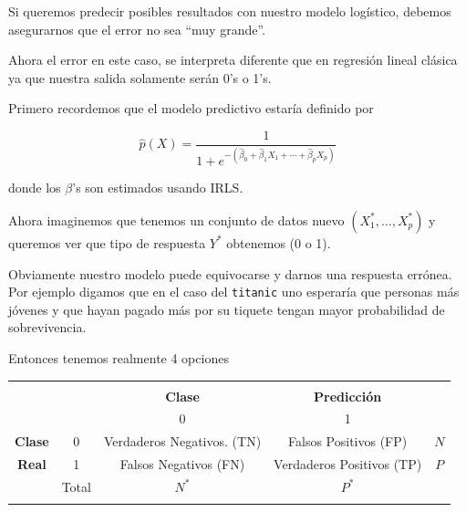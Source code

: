 \documentclass[
  12pt,
]{book}
\newenvironment{Shaded}{\begin{snugshade}}{\end{snugshade}}
\newcommand{\AttributeTok}[1]{\textcolor[rgb]{0.77,0.63,0.00}{#1}}
\newcommand{\FloatTok}[1]{\textcolor[rgb]{0.00,0.00,0.81}{#1}}
\newcommand{\FunctionTok}[1]{\textcolor[rgb]{0.00,0.00,0.00}{#1}}
\newcommand{\NormalTok}[1]{#1}
\newcommand{\OtherTok}[1]{\textcolor[rgb]{0.56,0.35,0.01}{#1}}
\newcommand{\SpecialCharTok}[1]{\textcolor[rgb]{0.00,0.00,0.00}{#1}}
\newcommand{\StringTok}[1]{\textcolor[rgb]{0.31,0.60,0.02}{#1}}
\theoremstyle{definition}
\theoremstyle{definition}
\theoremstyle{definition}
\theoremstyle{remark}
\begin{document}
Si queremos predecir posibles resultados con nuestro modelo logístico, debemos asegurarnos que el error no sea ``muy grande''.

Ahora el error en este caso, se interpreta diferente que en regresión lineal clásica ya que nuestra salida solamente serán 0's o 1's.

Primero recordemos que el modelo predictivo estaría definido por

\begin{equation*}
\hat{p}(X)=\frac{1}{1+e^{-(\hat{\beta}_{0}+\hat{\beta}_{1} X_{1}+\cdots+\hat{\beta}_{p} X_{p})}}
\end{equation*}

donde los \(\beta\)'s son estimados usando IRLS.

Ahora imaginemos que tenemos un conjunto de datos nuevo \((X^{*}_{1},\ldots,X^{*}_{p})\) y queremos ver que tipo de respuesta \(Y^{*}\) obtenemos (0 o 1).

Obviamente nuestro modelo puede equivocarse y darnos una respuesta errónea. Por ejemplo digamos que en el caso del \texttt{titanic} uno esperaría que personas más jóvenes y que hayan pagado más por su tiquete tengan mayor probabilidad de sobrevivencia.

Entonces tenemos realmente 4 opciones

\begin{longtable}[]{@{}ccccc@{}}
\toprule
& & & & \\ \addlinespace
\midrule
\endhead
& & \textbf{Clase} & \textbf{Predicción} & \\ \addlinespace
& & 0 & 1 & \\ \addlinespace
\textbf{Clase} & 0 & Verdaderos Negativos. (TN) & Falsos Positivos (FP) & \(N\) \\ \addlinespace
\textbf{Real} & 1 & Falsos Negativos (FN) & Verdaderos Positivos (TP) & \(P\) \\ \addlinespace
& Total & \(N^{*}\) & \(P^{*}\) & \\ \addlinespace
\bottomrule
\end{longtable}

\begin{Shaded}
\end{Shaded}
\end{document}
